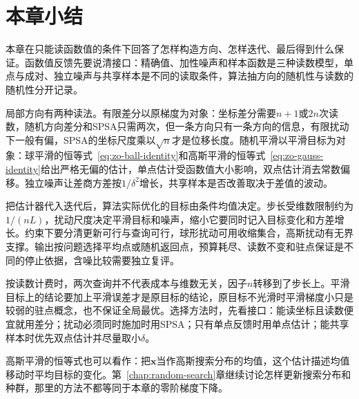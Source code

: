 \section{本章小结}
\label{sec:zo-summary}

本章在只能读函数值的条件下回答了怎样构造方向、怎样迭代、最后得到什么保证。函数值反馈先要说清接口：精确值、加性噪声和样本函数是三种读数模型，单点与成对、独立噪声与共享样本是不同的读取条件，算法抽方向的随机性与读数的随机性分开记录。

局部方向有两种读法。有限差分以原梯度为对象：坐标差分需要$n+1$或$2n$次读数，随机方向差分和SPSA只需两次，但一条方向只有一条方向的信息，有限扰动下一般有偏，SPSA的坐标尺度乘以$\sqrt{n}$才是位移长度。随机平滑以平滑目标为对象：球平滑的恒等式~\eqref{eq:zo-ball-identity}和高斯平滑的恒等式~\eqref{eq:zo-gauss-identity}给出严格无偏的估计，单点估计受函数值大小影响，双点估计消去常数偏移。独立噪声让差商方差按$1/\delta^2$增长，共享样本是否改善取决于差值的波动。

把估计器代入迭代后，算法实际优化的目标由条件均值决定。步长受维数限制约为$1/(nL)$，扰动尺度决定平滑目标和噪声，缩小它要同时记入目标变化和方差增长。约束下要分清更新可行与查询可行，球形扰动可用收缩集合，高斯扰动有无界支撑。输出按问题选择平均点或随机返回点，预算耗尽、读数不变和驻点保证是不同的停止依据，含噪比较需要独立复评。

按读数计费时，两次查询并不代表成本与维数无关，因子$n$转移到了步长上。平滑目标上的结论要加上平滑误差才是原目标的结论，原目标不光滑时平滑梯度小只是较弱的驻点概念，也不保证全局最优。选择方法时，先看接口：能读坐标且读数便宜就用差分；扰动必须同时施加时用SPSA；只有单点反馈时用单点估计；能共享样本时优先双点估计并尽量取小$\delta$。

高斯平滑的恒等式也可以看作：把$\bm{x}$当作高斯搜索分布的均值，这个估计描述均值移动时平均目标的变化。第~\ref{chap:random-search}章继续讨论怎样更新搜索分布和种群，那里的方法不都等同于本章的零阶梯度下降。
